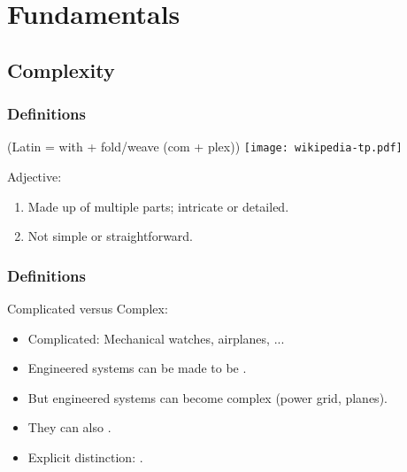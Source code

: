 

\section{Fundamentals}

\subsection{Complexity}

\begin{frame}
  \frametitle{Definitions}

   (Latin = with + fold/weave (com + plex))
  \hfill
  \texttt{[image: wikipedia-tp.pdf]}

  \medskip

  \begin{block}{Adjective:}
    \begin{enumerate}
    \item Made up of multiple parts; intricate or detailed.
    \item Not simple or straightforward.
    \end{enumerate}
  \end{block}

\end{frame}


\begin{frame}
  \frametitle{Definitions}

  \begin{block}{Complicated versus Complex:}
    \begin{itemize}
    \item <1-> Complicated: Mechanical watches, airplanes, ...
    \item <2-> Engineered systems can be made to be .
    \item <3-> But engineered systems can become complex (power grid, planes).
    \item <4-> They can also .
    \item <5-> Explicit distinction: .
    \end{itemize}
  \end{block}


\end{frame}

